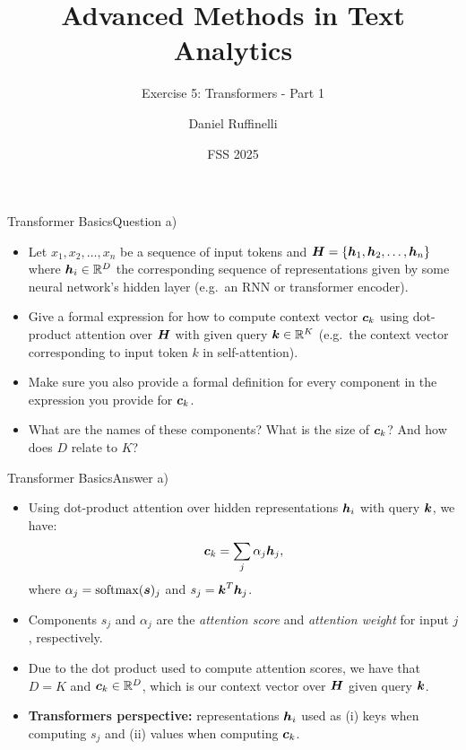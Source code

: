 \documentclass[t]{beamer}
\title[Write your short title here]{Advanced Methods in Text Analytics}
\subtitle{Exercise 5: Transformers - Part 1}
\author{Daniel Ruffinelli}
\institute{University of Mannheim}
\date{FSS 2025}
\begin{document}

\begin{frame}
    \titlepage{}
\end{frame}

\begin{frame}{Transformer Basics}{Question a)}
    \begin{itemize}
        \item Let $x_1,x_2,\ldots, x_n$ be a sequence of input tokens and
              ${\boldsymbol{H}} = \{{\boldsymbol{h}}_1,{\boldsymbol{h}}_2,\ldots, {\boldsymbol{h}}_n\}$ where ${\boldsymbol{h}}_i\in\mathbb{R}^D$ the
              corresponding sequence of representations given by some neural
              network's hidden layer (e.g.\ an RNN or transformer encoder).
        \item Give a formal expression for how to compute context vector ${\boldsymbol{c}}_k$
              using dot-product attention over ${\boldsymbol{H}}$ with given query
              ${\boldsymbol{k}}\in\mathbb{R}^K$ (e.g.\ the context vector corresponding to input
              token $k$ in self-attention).
        \item Make sure you also provide a formal definition for every component
              in the expression you provide for ${\boldsymbol{c}}_k$.
        \item What are the names of these components? What is the size of
              ${\boldsymbol{c}}_k$? And how does $D$ relate to $K$?
    \end{itemize}
\end{frame}

\begin{frame}{Transformer Basics}{Answer a)}
    \begin{itemize}
        \item Using dot-product attention over hidden representations ${\boldsymbol{h}}_i$
              with query ${\boldsymbol{k}}$, we have:
              \begin{align*}
                  {\boldsymbol{c}}_k = \sum_j \alpha_j{\boldsymbol{h}}_j,
              \end{align*}
              where $\alpha_j= \operatorname{softmax}({\boldsymbol{s}})_j$ and
              $s_j = {\boldsymbol{k}}^T{\boldsymbol{h}}_j$.
              \pause
        \item Components $s_j$ and $\alpha_j$ are the \emph{attention score} and
              \emph{attention weight} for input $j$, respectively.
              \pause
        \item Due to the dot product used to compute attention scores, we have
              that $D = K$ and ${\boldsymbol{c}}_k\in\mathbb{R}^D$, which is our context vector
              over ${\boldsymbol{H}}$ given query ${\boldsymbol{k}}$.
              \pause
        \item \textbf{Transformers perspective:} representations ${\boldsymbol{h}}_i$ used as
              (i) keys when computing $s_j$ and (ii) values when computing
              ${\boldsymbol{c}}_k$.
    \end{itemize}
\end{frame}
\end{document}
